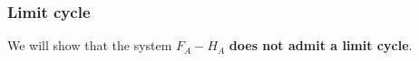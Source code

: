 \documentclass{article}
\begin{document}

\subsubsection{Limit cycle}
We will show that the system $F_A-H_A$ \textbf{does not admit a limit cycle}.
\end{document}
